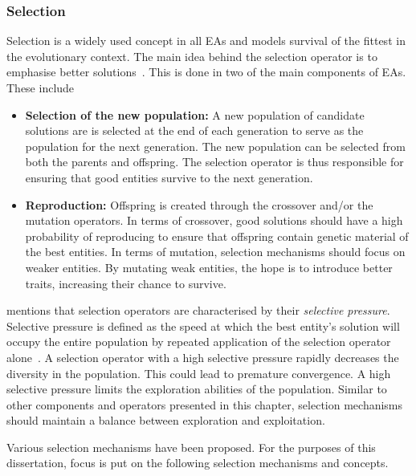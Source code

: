 \subsubsection{Selection}
\label{sec:heuristics:mh:ga:selection}

Selection is a widely used concept in all \acp{EA} and models survival of the fittest in the evolutionary context. The main idea behind the selection operator is to emphasise better solutions~\cite{ref:engelbrecht:2007}. This is done in two of the main components of \acp{EA}. These include

\begin{itemize}
      \item \textbf{Selection of the new population: } A new population of candidate solutions are is selected at the end of each generation to serve as the population for the next generation. The new population can be selected from both the parents and offspring. The selection operator is thus responsible for ensuring that good entities survive to the next generation.

      \item \textbf{Reproduction: } Offspring is created through the crossover and/or the mutation operators. In terms of crossover, good solutions should have a high probability of reproducing to ensure that offspring contain genetic material of the best entities. In terms of mutation, selection mechanisms should focus on weaker entities. By mutating weak entities, the hope is to introduce better traits, increasing their chance to survive.
\end{itemize}

\citeauthor{ref:engelbrecht:2007}\cite{ref:engelbrecht:2007} mentions that selection operators are characterised by their \textit{selective pressure}. Selective pressure is defined as the speed at which the best entity's solution will occupy the entire population by repeated application of the selection operator alone~\cite{ref:back:1994}. A selection operator with a high selective pressure rapidly decreases the diversity in the population. This could lead to premature convergence. A high selective pressure limits the exploration abilities of the population. Similar to other components and operators presented in this chapter, selection mechanisms should maintain a balance between exploration and exploitation.

Various selection mechanisms have been proposed. For the purposes of this dissertation, focus is put on the following selection mechanisms and concepts.

